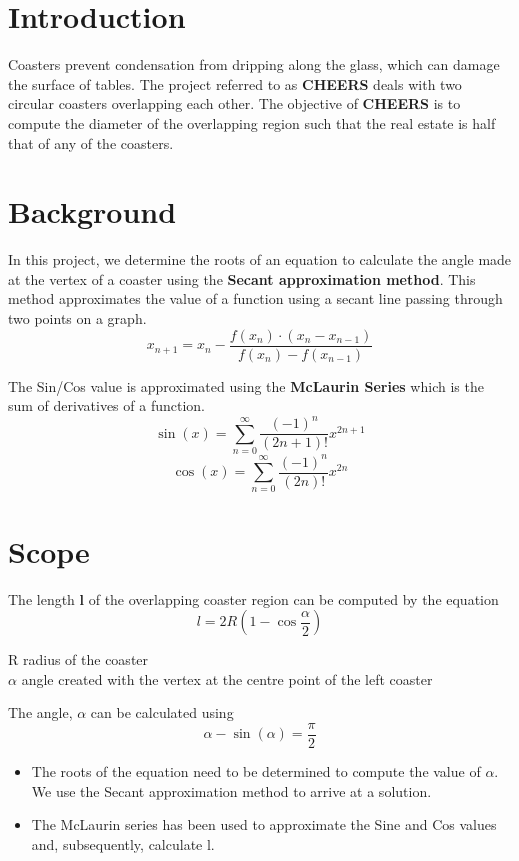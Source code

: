 \section{Introduction}
  Coasters prevent condensation from dripping along the glass, which can damage the surface of tables. The project referred to as \textbf {CHEERS} deals with two circular coasters overlapping each other. The objective of \textbf {CHEERS} is to compute the diameter of the overlapping region such that 
  the real estate is half that of any of the coasters.

\section{Background}
  In this project, we determine the roots of an equation to calculate the angle made at the vertex of a coaster using the \textbf{Secant approximation method}. This method approximates the value of a function using a secant line passing through two points on a graph.
  $$ x_{n+1} = x_n - \frac{f(x_n) \cdot (x_n - x_{n-1})}{f(x_n) - f(x_{n-1})} $$

  \vspace*{20pt}
  \noindent The Sin/Cos value is approximated using the \textbf{McLaurin Series} which is the sum of derivatives of a function.
  $$\sin(x) = \sum_{n=0}^{\infty} \frac{(-1)^n}{(2n+1)!}x^{2n+1}$$
  $$\cos(x) = \sum_{n=0}^{\infty} \frac{(-1)^n}{(2n)!}x^{2n}$$ 

\section{Scope}
  The length \textbf{l} of the overlapping coaster region can be computed by the equation
  $$l = 2R\left(1 - \cos\frac{\alpha}{2}\right)$$

  \indent R \textrightarrow \;radius of the coaster \\
  \indent $\alpha$ \textrightarrow \;angle created with the vertex at the centre point of the left coaster

  \vspace{20pt}
  The angle, $\alpha$ can be calculated using
  $$\alpha - \sin(\alpha) = \frac{\pi}{2}$$
  
  \vspace*{20pt}
  
  \begin{itemize}
    \item {The roots of the equation need to be determined to compute the value of $\alpha$. We use the Secant approximation method to arrive at a solution.}
    \item {The McLaurin series has been used to approximate the Sine and Cos values and, subsequently, calculate l.}
  \end{itemize}

